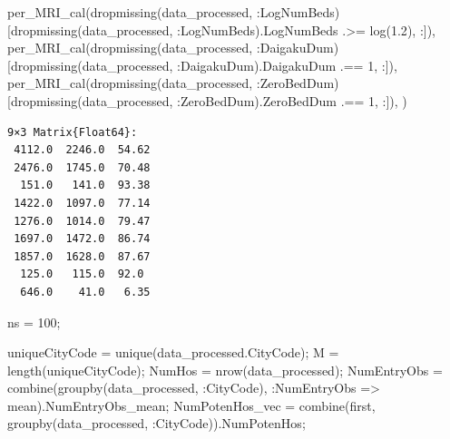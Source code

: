 \documentclass[
  letterpaper,
  DIV=11,
  numbers=noendperiod]{scrreprt}
\newenvironment{Shaded}{\begin{snugshade}}{\end{snugshade}}
\newcommand{\FloatTok}[1]{\textcolor[rgb]{0.68,0.00,0.00}{#1}}
\newcommand{\FunctionTok}[1]{\textcolor[rgb]{0.28,0.35,0.67}{#1}}
\newcommand{\NormalTok}[1]{\textcolor[rgb]{0.00,0.23,0.31}{#1}}
\newcommand{\OperatorTok}[1]{\textcolor[rgb]{0.37,0.37,0.37}{#1}}
\begin{document}
\begin{Shaded}
\begin{Highlighting}[]
    \FunctionTok{per\_MRI\_cal}\NormalTok{(}\FunctionTok{dropmissing}\NormalTok{(data\_processed, }\OperatorTok{:}\NormalTok{LogNumBeds)[}\FunctionTok{dropmissing}\NormalTok{(data\_processed, }\OperatorTok{:}\NormalTok{LogNumBeds).LogNumBeds }\OperatorTok{.\textgreater{}=} \FunctionTok{log}\NormalTok{(}\FloatTok{1.2}\NormalTok{), }\OperatorTok{:}\NormalTok{]),}
    \FunctionTok{per\_MRI\_cal}\NormalTok{(}\FunctionTok{dropmissing}\NormalTok{(data\_processed, }\OperatorTok{:}\NormalTok{DaigakuDum)[}\FunctionTok{dropmissing}\NormalTok{(data\_processed, }\OperatorTok{:}\NormalTok{DaigakuDum).DaigakuDum }\OperatorTok{.==} \FloatTok{1}\NormalTok{, }\OperatorTok{:}\NormalTok{]),}
    \FunctionTok{per\_MRI\_cal}\NormalTok{(}\FunctionTok{dropmissing}\NormalTok{(data\_processed, }\OperatorTok{:}\NormalTok{ZeroBedDum)[}\FunctionTok{dropmissing}\NormalTok{(data\_processed, }\OperatorTok{:}\NormalTok{ZeroBedDum).ZeroBedDum }\OperatorTok{.==} \FloatTok{1}\NormalTok{, }\OperatorTok{:}\NormalTok{]),}
\NormalTok{)}
\end{Highlighting}
\end{Shaded}

\begin{verbatim}
9×3 Matrix{Float64}:
 4112.0  2246.0  54.62
 2476.0  1745.0  70.48
  151.0   141.0  93.38
 1422.0  1097.0  77.14
 1276.0  1014.0  79.47
 1697.0  1472.0  86.74
 1857.0  1628.0  87.67
  125.0   115.0  92.0
  646.0    41.0   6.35
\end{verbatim}

\begin{Shaded}
\begin{Highlighting}[]
\NormalTok{ns }\OperatorTok{=} \FloatTok{100}\NormalTok{;}

\NormalTok{uniqueCityCode }\OperatorTok{=} \FunctionTok{unique}\NormalTok{(data\_processed.CityCode);}
\NormalTok{M }\OperatorTok{=} \FunctionTok{length}\NormalTok{(uniqueCityCode);}
\NormalTok{NumHos }\OperatorTok{=} \FunctionTok{nrow}\NormalTok{(data\_processed);}
\NormalTok{NumEntryObs }\OperatorTok{=} \FunctionTok{combine}\NormalTok{(}\FunctionTok{groupby}\NormalTok{(data\_processed, }\OperatorTok{:}\NormalTok{CityCode), }\OperatorTok{:}\NormalTok{NumEntryObs }\OperatorTok{=\textgreater{}}\NormalTok{ mean).NumEntryObs\_mean;}
\NormalTok{NumPotenHos\_vec }\OperatorTok{=} \FunctionTok{combine}\NormalTok{(first, }\FunctionTok{groupby}\NormalTok{(data\_processed, }\OperatorTok{:}\NormalTok{CityCode)).NumPotenHos;}
\end{Highlighting}
\end{Shaded}
\end{document}

